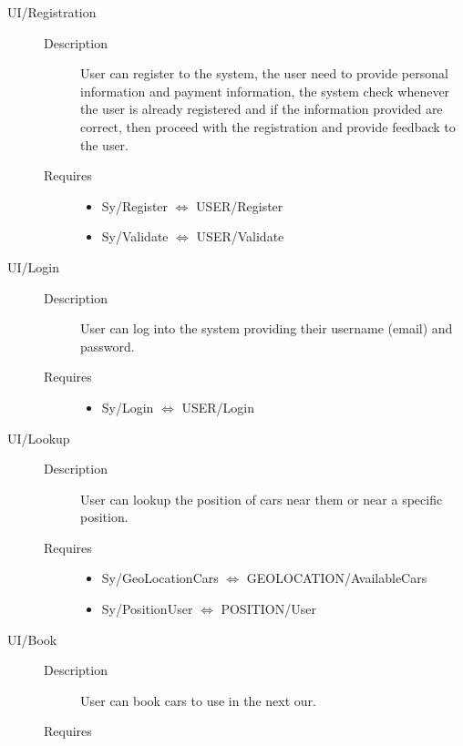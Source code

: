 \documentclass[11pt]{article} %
\begin{document}
\begin{description}
	\item[UI/Registration] \hfill
	\begin{description}
		\item[Description] User can register to the system, the user need to provide personal information and payment information, the system check whenever the user is already registered and if the information provided are correct, then proceed with the registration and provide feedback to the user.
		\item[Requires] \hfill
		\begin{itemize}
			\item Sy/Register $\Leftrightarrow$ USER/Register
			\item Sy/Validate $\Leftrightarrow$ USER/Validate
		\end{itemize}
	\end{description}
	\item[UI/Login] \hfill
	\begin{description}
		\item[Description] User can log into the system providing their username (email) and password.
		\item[Requires] \hfill
		\begin{itemize}
			\item Sy/Login $\Leftrightarrow$ USER/Login
		\end{itemize}
	\end{description}
	\item[UI/Lookup] \hfill
	\begin{description}
		\item[Description] User can lookup the position of cars near them or near a specific position.
		\item[Requires] \hfill
		\begin{itemize}
			\item Sy/GeoLocationCars $\Leftrightarrow$ GEOLOCATION/AvailableCars
			\item Sy/PositionUser $\Leftrightarrow$ POSITION/User
		\end{itemize}
	\end{description}
	\item[UI/Book] \hfill
	\begin{description}
		\item[Description] User can book cars to use in the next our.
		\item[Requires] \hfill
		\begin{itemize}

\end{itemize}
\end{description}
\end{description}
\end{document}
